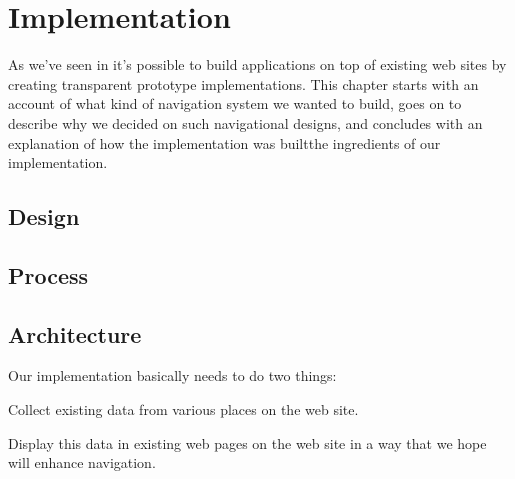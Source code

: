 \chapter{Implementation}
\label{chapter:implementation}


As we've seen in 
it's possible to build applications on top of existing web sites by creating
transparent prototype implementations. This chapter starts with an account of
what kind of navigation system we wanted to build, goes on to describe why we
decided on such navigational designs, and concludes with an explanation of how
the implementation was built\dash{}the ingredients of our implementation.

\section{Design}


\section{Process}

\section{Architecture}

Our implementation basically needs to do two things:

\begin{enum}
  \item Collect existing data from various places on the \urort web site.
  \item Display this data in existing web pages on the \urort web site in
    a way that we hope will enhance navigation.
\end{enum}

